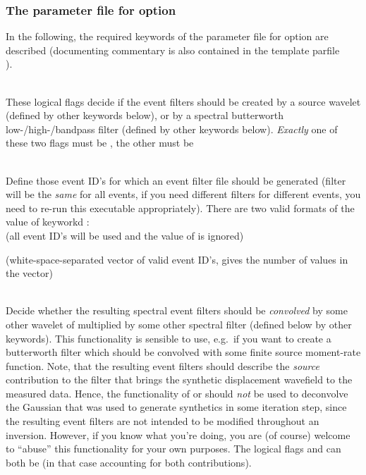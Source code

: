 \subsubsection{The parameter file for option }
In the following, the required keywords of the parameter file for option  are described 
(documenting commentary is also contained in the template parfile\\
).

\textbf{}\\
These logical flags decide if the event filters should be created by a source wavelet (defined by other keywords below),
or by a spectral butterworth low-/high-/bandpass filter (defined by other keywords below).
\emph{Exactly} one of these two flags must be , the other must be  

\textbf{}\\
Define those event ID's for which an event filter file should be generated (filter will be the \emph{same}
for all events, if you need different filters for different events, you need to re-run this executable
appropriately). There are two valid formats of the value of keyworkd :\\

 (all event ID's will be used and the value of  is ignored)

 (white-space-separated vector of valid event ID's, 
 gives the number of values in the vector)

\textbf{}\\
Decide whether the resulting spectral event filters should be \emph{convolved} by some other wavelet
of multiplied by some other spectral filter (defined below by other keywords).
This functionality is sensible to use, e.g.\ if you want to create a butterworth filter
which should be convolved with some finite source moment-rate function. Note, that the resulting
event filters should describe the \emph{source} contribution to the filter that brings the synthetic
displacement wavefield to the measured data. Hence, the functionality of 
or  should \emph{not} be used to deconvolve the Gaussian that was used to
generate synthetics in some iteration step, since the resulting event filters are not intended
to be modified throughout an inversion. However, if you know what you're doing, you are (of course) welcome
to ``abuse'' this functionality for your own purposes.
The logical flags  and  can both be 
 (in that case accounting for both contributions).

